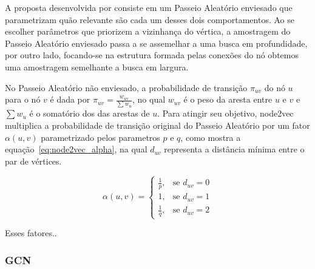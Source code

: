 A proposta desenvolvida por \citet{grover16} consiste em um Passeio Aleatório
enviesado que parametrizam quão relevante são cada um desses dois comportamentos.
Ao se escolher parâmetros que priorizem a vizinhança do vértica, a amostragem do
Passeio Aleatório enviesado passa a se assemelhar a uma busca em profundidade,
por outro lado, focando-se na estrutura formada pelas conexões do nó obtemos uma
amostragem semelhante a busca em largura.

No Passeio Aleatório não enviesado, a probabilidade de transição $\pi_{uv}$ do
nó $u$ para o nó $v$ é dada por $\pi_{uv} = \frac{w_{uv}}{\sum{w_u}}$, no qual
$w_{uv}$ é o peso da aresta entre $u$ e $v$ e $\sum{w_u}$ é o somatório dos das
arestas de $u$.
Para atingir seu objetivo, node2vec multiplica a probabilidade de transição
original do Passeio Aleatório por um fator $\alpha(u, v)$ parametrizado pelos
parametros $p$ e $q$, como mostra a equação~\ref{eq:node2vec_alpha}, na qual
$d_{uv}$ representa a distância mínima entre o par de vértices.

\begin{equation} \label{eq:node2vec_alpha}
    \alpha(u, v) =
    \begin{cases}
        \frac{1}{p} ,& \text{se } d_{uv} = 0\\
        1           ,& \text{se } d_{uv} = 1\\
        \frac{1}{q} ,& \text{se } d_{uv} = 2
    \end{cases}
\end{equation}

Esses fatores..


\subsubsection{GCN}
